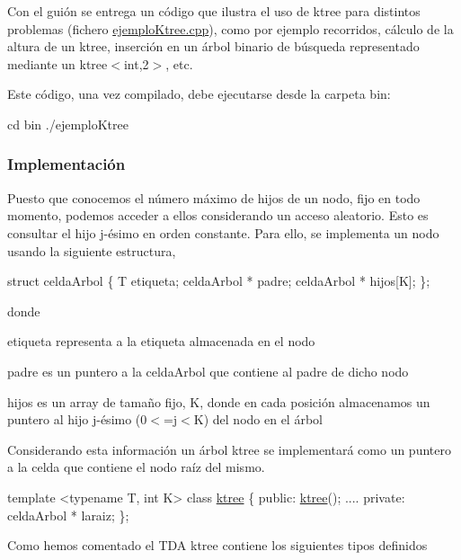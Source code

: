 Con el guión se entrega un código que ilustra el uso de ktree para distintos problemas (fichero {\ttfamily \hyperlink{ejemploKtree_8cpp}{ejemplo\+Ktree.\+cpp}}), como por ejemplo recorridos, cálculo de la altura de un ktree, inserción en un árbol binario de búsqueda representado mediante un ktree$<$int,2$>$, etc.

Este código, una vez compilado, debe ejecutarse desde la carpeta {\ttfamily bin}\+:


\begin{DoxyCode}
cd bin 
./ejemploKtree 
\end{DoxyCode}
\hypertarget{index_implem}{}\subsubsection{Implementación}\label{index_implem}
Puesto que conocemos el número máximo de hijos de un nodo, fijo en todo momento, podemos acceder a ellos considerando un acceso aleatorio. Esto es consultar el hijo j-\/ésimo en orden constante. Para ello, se implementa un nodo usando la siguiente estructura,


\begin{DoxyCode}
\textcolor{keyword}{struct }celdaArbol \{
  T etiqueta;
  celdaArbol * padre;
  celdaArbol * hijos[K];
\};
\end{DoxyCode}


donde \begin{DoxyItemize}
\item etiqueta representa a la etiqueta almacenada en el nodo \item padre es un puntero a la celda\+Arbol que contiene al padre de dicho nodo \item hijos es un array de tamaño fijo, K, donde en cada posición almacenamos un puntero al hijo j-\/ésimo (0$<$=j$<$K) del nodo en el árbol\end{DoxyItemize}
Considerando esta información un árbol ktree se implementará como un puntero a la celda que contiene el nodo raíz del mismo.


\begin{DoxyCode}
\textcolor{keyword}{template} <\textcolor{keyword}{typename} T, \textcolor{keywordtype}{int} K> 
\textcolor{keyword}{class }\hyperlink{classktree}{ktree} \{
  \textcolor{keyword}{public}:
   \hyperlink{classktree_a70c8511d0c0fc199f341065fab0aa0ad}{ktree}();
   ....
  \textcolor{keyword}{private}:
    celdaArbol * laraiz;
\};
\end{DoxyCode}


Como hemos comentado el T\+DA ktree contiene los siguientes tipos definidos

